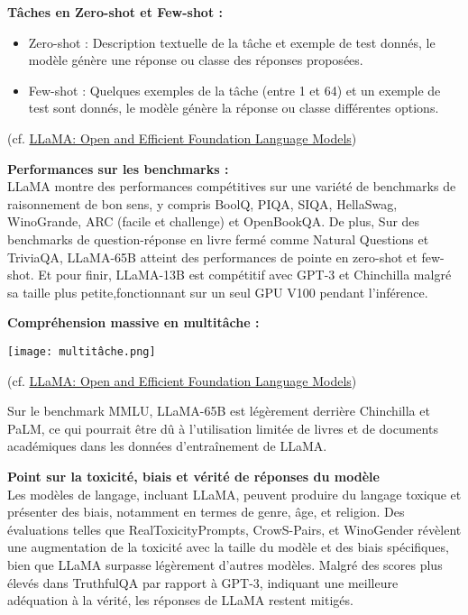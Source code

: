 \documentclass[11pt]{rapport_class}
\begin{document}
\textbf{Tâches en Zero-shot et Few-shot : }
\begin{itemize}
\item Zero-shot : Description textuelle de la tâche et exemple de test donnés, le modèle génère une réponse ou classe des réponses proposées.
\item Few-shot : Quelques exemples de la tâche (entre 1 et 64) et un exemple de test sont donnés, le modèle génère la réponse ou classe différentes options.
\end{itemize}
\begin{tiny}
    (cf. \href{https://arxiv.org/pdf/2302.13971.pdf}{LLaMA: Open and Efficient Foundation Language Models})
\end{tiny}


\vspace{5mm}
\textbf{Performances sur les benchmarks : } \\
\vspace{0mm}
\qquad LLaMA montre des performances compétitives sur une variété de benchmarks de raisonnement de bon sens, y compris BoolQ, PIQA, SIQA, HellaSwag, WinoGrande, ARC (facile et challenge) et OpenBookQA. De plus, Sur des benchmarks de question-réponse en livre fermé comme Natural Questions et TriviaQA, LLaMA-65B atteint des performances de pointe en zero-shot et few-shot. Et pour finir, LLaMA-13B est compétitif avec GPT-3 et Chinchilla malgré sa taille plus petite,fonctionnant sur un seul GPU V100 pendant l'inférence. 

\vspace{3mm}


\vspace{5mm}
\textbf{Compréhension massive en multitâche : } \\

\begin{center}
    \texttt{[image: multitâche.png]}\\
    \begin{tiny}
        (cf. \href{https://arxiv.org/pdf/2302.13971.pdf}{LLaMA: Open and Efficient Foundation Language Models})
    \end{tiny}
\end{center}

\qquad Sur le benchmark MMLU, LLaMA-65B est légèrement derrière Chinchilla et PaLM, ce qui pourrait être dû à l'utilisation limitée de livres et de documents académiques dans les données d'entraînement de LLaMA.

\vspace{3mm}
\textbf{Point sur la toxicité, biais et vérité de réponses du modèle } \\
\vspace{0mm}
\qquad Les modèles de langage, incluant LLaMA, peuvent produire du langage toxique et présenter des biais, notamment en termes de genre, âge, et religion. Des évaluations telles que RealToxicityPrompts, CrowS-Pairs, et WinoGender révèlent une augmentation de la toxicité avec la taille du modèle et des biais spécifiques, bien que LLaMA surpasse légèrement d'autres modèles. Malgré des scores plus élevés dans TruthfulQA par rapport à GPT-3, indiquant une meilleure adéquation à la vérité, les réponses de LLaMA restent mitigés. 
\end{document}
